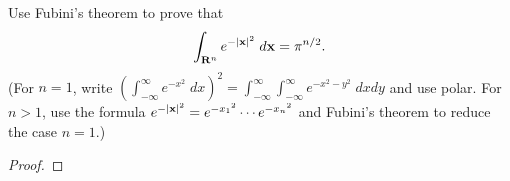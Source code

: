 \begin{problem}
Use Fubini's theorem to prove that
\[
\int_{\mathbf{R}^n}e^{-|\mathbf{x}|^2}\;d\mathbf{x}=\pi^{n/2}.
\]
(For $n=1$, write $\left(\int_{-\infty}^\infty
e^{-x^2}\;dx\right)^2=\int_{-\infty}^\infty\int_{-\infty}^\infty e^{-x^2-y^2}\;dxdy$
and use polar. For $n>1$, use the formula $e^{-|\mathbf{x}|^2}=e^{-{x_1}^2}\cdots
e^{-{x_n}^2}$ and Fubini's theorem to reduce the case $n=1$.)
\end{problem}
\begin{proof}
\end{proof}

